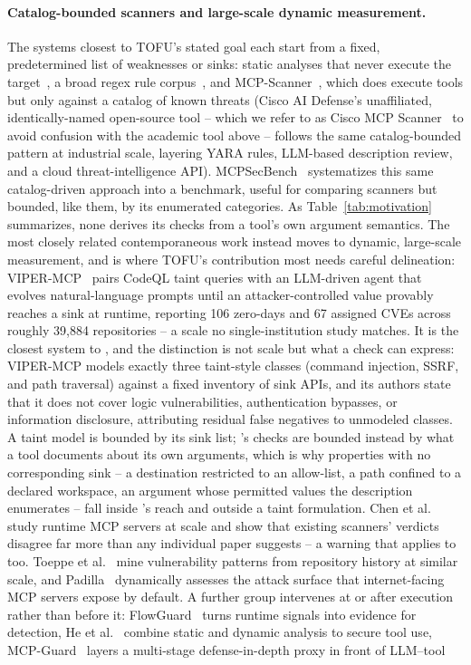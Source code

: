 \paragraph{Catalog-bounded scanners and large-scale dynamic measurement.}
The systems closest to TOFU's stated goal each start from a fixed, predetermined list of weaknesses or sinks: static analyses that never execute the target~\cite{mcp-first-glance,mcp-seclint}, a broad regex rule corpus~\cite{agentthreatrules}, and MCP-Scanner~\cite{mcp-scanner}, which does execute tools but only against a catalog of known threats (Cisco AI Defense's unaffiliated, identically-named open-source tool -- which we refer to as Cisco MCP Scanner~\cite{cisco2025mcpscanner} to avoid confusion with the academic tool above -- follows the same catalog-bounded pattern at industrial scale, layering YARA rules, LLM-based description review, and a cloud threat-intelligence API). MCPSecBench~\cite{yang2025mcpsecbench} systematizes this same catalog-driven approach into a benchmark, useful for comparing scanners but bounded, like them, by its enumerated categories. As Table~\ref{tab:motivation} summarizes, none derives its checks from a tool's own argument semantics. The most closely related contemporaneous work instead moves to dynamic, large-scale measurement, and is where TOFU's contribution most needs careful delineation: VIPER-MCP~\cite{viper-mcp} pairs CodeQL taint queries with an LLM-driven agent that evolves natural-language prompts until an attacker-controlled value provably reaches a sink at runtime, reporting 106 zero-days and 67 assigned CVEs across roughly 39{,}884 repositories -- a scale no single-institution study matches. It is the closest system to \project{}, and the distinction is not scale but what a check can express: VIPER-MCP models exactly three taint-style classes (command injection, SSRF, and path traversal) against a fixed inventory of sink APIs, and its authors state that it does not cover logic vulnerabilities, authentication bypasses, or information disclosure, attributing residual false negatives to unmodeled classes. A taint model is bounded by its sink list; \project{}'s checks are bounded instead by what a tool documents about its own arguments, which is why properties with no corresponding sink -- a destination restricted to an allow-list, a path confined to a declared workspace, an argument whose permitted values the description enumerates -- fall inside \project{}'s reach and outside a taint formulation. Chen et al.~\cite{mcpzoo} study runtime MCP servers at scale and show that existing scanners' verdicts disagree far more than any individual paper suggests -- a warning that applies to \project{} too. Toeppe et al.~\cite{toeppe2026largescale} mine vulnerability patterns from repository history at similar scale, and Padilla~\cite{padilla2026exposed} dynamically assesses the attack surface that internet-facing MCP servers expose by default. A further group intervenes at or after execution rather than before it: FlowGuard~\cite{flowguard} turns runtime signals into evidence for detection, He et al.~\cite{mtguard} combine static and dynamic analysis to secure tool use, MCP-Guard~\cite{xing2026mcpguard} layers a multi-stage defense-in-depth proxy in front of LLM--tool 